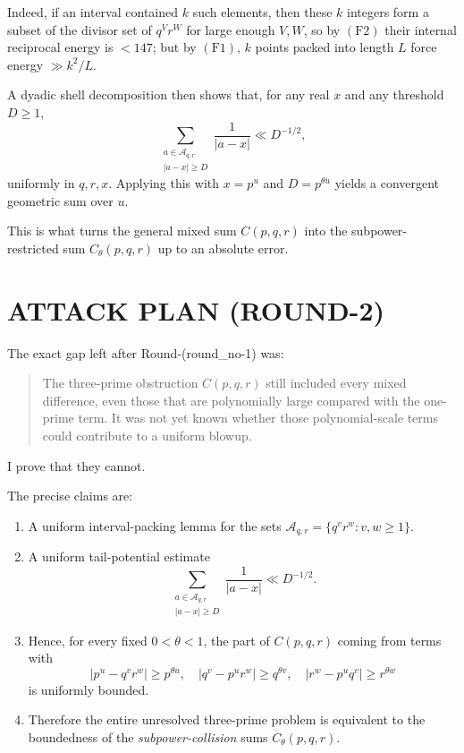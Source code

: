 Indeed, if an interval contained \(k\) such elements, then these \(k\) integers form a subset of the divisor set of \(q^V r^W\) for large enough \(V,W\), so by \((\mathrm{F2})\) their internal reciprocal energy is \(<147\); but by \((\mathrm{F1})\), \(k\) points packed into length \(L\) force energy \(\gg k^2/L\).

A dyadic shell decomposition then shows that, for any real \(x\) and any threshold \(D\ge 1\),
\[
\sum_{\substack{a\in \mathcal A_{q,r}\\ |a-x|\ge D}}\frac{1}{|a-x|}
\ll D^{-1/2},
\]
uniformly in \(q,r,x\). Applying this with \(x=p^u\) and \(D=p^{\theta u}\) yields a convergent geometric sum over \(u\).

This is what turns the general mixed sum \(C(p,q,r)\) into the subpower-restricted sum \(C_\theta(p,q,r)\) up to an absolute error.

\section{ATTACK PLAN (ROUND-2)}

The exact gap left after Round-(round\_no-1) was:

\begin{quote}
The three-prime obstruction \(C(p,q,r)\) still included every mixed difference, even those that are polynomially large compared with the one-prime term. It was not yet known whether those polynomial-scale terms could contribute to a uniform blowup.
\end{quote}

I prove that they cannot.

The precise claims are:

\begin{enumerate}
\item A uniform interval-packing lemma for the sets \(\mathcal A_{q,r}=\{q^v r^w:v,w\ge 1\}\).
\item A uniform tail-potential estimate
\[
\sum_{\substack{a\in \mathcal A_{q,r}\\ |a-x|\ge D}}\frac{1}{|a-x|}\ll D^{-1/2}.
\]
\item Hence, for every fixed \(0<\theta<1\), the part of \(C(p,q,r)\) coming from terms with
\[
|p^u-q^v r^w|\ge p^{\theta u},
\quad
|q^v-p^u r^w|\ge q^{\theta v},
\quad
|r^w-p^u q^v|\ge r^{\theta w}
\]
is uniformly bounded.
\item Therefore the entire unresolved three-prime problem is equivalent to the boundedness of the \emph{subpower-collision} sums \(C_\theta(p,q,r)\).
\end{enumerate}

